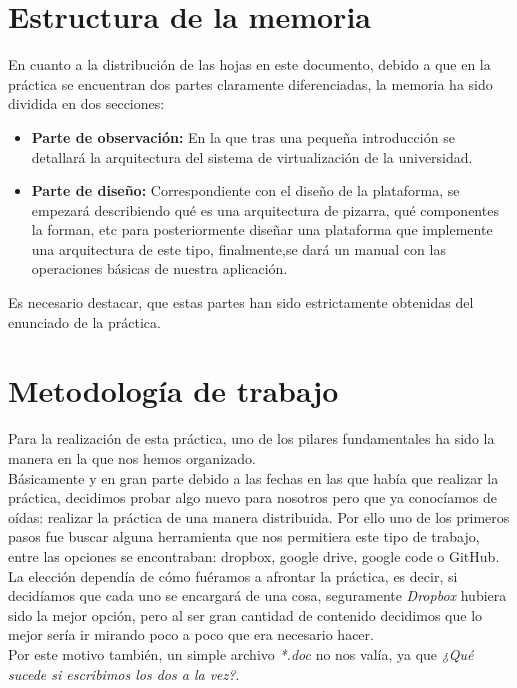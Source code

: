 \section*{Estructura de la memoria}
En cuanto a la distribución de las hojas en este documento, debido a que en la práctica se encuentran dos partes claramente diferenciadas, la memoria ha sido dividida en dos secciones:
\begin{itemize}
\item \textbf{Parte de observación:} En la que tras una pequeña introducción se detallará la arquitectura del sistema de virtualización de la universidad.
\item \textbf{Parte de diseño:} Correspondiente con el diseño de la plataforma, se empezará describiendo qué es una arquitectura de pizarra, qué componentes la forman, etc para posteriormente diseñar una plataforma que implemente una arquitectura de este tipo, finalmente,se dará un manual con las operaciones básicas de nuestra aplicación. 
\end{itemize}

Es necesario destacar, que estas partes han sido estrictamente obtenidas del enunciado de la práctica.

\section*{Metodología de trabajo}

Para la realización de esta práctica, uno de los pilares fundamentales ha sido la manera en la que nos hemos organizado.\\

Básicamente y en gran parte debido a las fechas en las que había que realizar la práctica, decidimos probar algo nuevo para nosotros pero que ya conocíamos de oídas: realizar la práctica de una manera distribuida. Por ello uno de los primeros pasos fue buscar alguna herramienta que nos permitiera este tipo de trabajo, entre las opciones se encontraban: dropbox, google drive, google code o GitHub.\\

La elección dependía de cómo fuéramos a afrontar la práctica, es decir, si decidíamos que cada uno se encargará de una cosa, seguramente \emph{Dropbox} hubiera sido la mejor opción, pero al ser gran cantidad de contenido decidimos que lo mejor sería ir mirando poco a poco que era necesario hacer.\\

Por este motivo también, un simple archivo \emph{*.doc} no nos valía, ya que \emph{¿Qué sucede si escribimos los dos a la vez?}.\\

